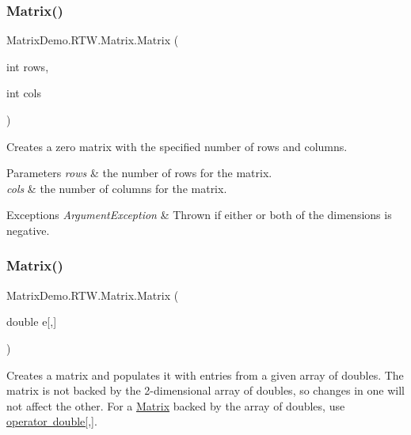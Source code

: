 \subsubsection{\texorpdfstring{Matrix()}{Matrix()}\hspace{0.1cm}{\footnotesize\ttfamily [1/2]}}
{\footnotesize\ttfamily Matrix\+Demo.\+R\+T\+W.\+Matrix.\+Matrix (\begin{DoxyParamCaption}\item[{int}]{rows,  }\item[{int}]{cols }\end{DoxyParamCaption})}



Creates a zero matrix with the specified number of rows and columns. 


\begin{DoxyParams}{Parameters}
{\em rows} & the number of rows for the matrix.\\
\hline
{\em cols} & the number of columns for the matrix.\\
\hline
\end{DoxyParams}

\begin{DoxyExceptions}{Exceptions}
{\em Argument\+Exception} & Thrown if either or both of the dimensions is negative.\\
\hline
\end{DoxyExceptions}
\mbox{\label{class_matrix_demo_1_1_r_t_w_1_1_matrix_ad2a320fd0c86551f34070679fd43433c}} 
\subsubsection{\texorpdfstring{Matrix()}{Matrix()}\hspace{0.1cm}{\footnotesize\ttfamily [2/2]}}
{\footnotesize\ttfamily Matrix\+Demo.\+R\+T\+W.\+Matrix.\+Matrix (\begin{DoxyParamCaption}\item[{double}]{e\mbox{[},\mbox{]} }\end{DoxyParamCaption})}



Creates a matrix and populates it with entries from a given array of doubles. The matrix is not backed by the 2-\/dimensional array of doubles, so changes in one will not affect the other. For a \mbox{\hyperlink{class_matrix_demo_1_1_r_t_w_1_1_matrix}{Matrix}} backed by the array of doubles, use \mbox{\hyperlink{class_matrix_demo_1_1_r_t_w_1_1_matrix_ac23641ac04b3c3baf14174bdf9049db2}{operator double\mbox{[},\mbox{]}}}. 


